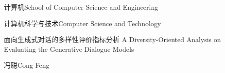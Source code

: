 \school
{计算机}{School of Computer Science and Engineering}

\major
{计算机科学与技术}{Computer Science and Technology}

\thesistitle
{面向生成式对话的多样性评价指标分析}
{}
{A Diversity-Oriented Analysis on Evaluating the Generative Dialogue Models}
{}

\thesisauthor
{冯聪}{Cong Feng}









